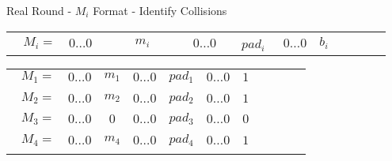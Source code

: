 \begin{frame}{Real Round - $M_i$ Format - Identify Collisions}

\begin{table}[]
\centering
\begin{tabular}{c|c|c|c|c|c|c|llll}
\cline{2-7}
$\, \ \ \ M_i = $ & $0 \dotsc 0$ & $\, \ \qquad m_i \, \ \qquad$ & $0 \dotsc 0$ & \ \ $pad_i \ \ $ & $0 \dotsc 0$ & $b_i$ &  &  &  &  \\ \cline{2-7}
\end{tabular}
\end{table}

\begin{table}[]
\centering
\begin{tabular}{ccccccrllll}
\cline{2-7}
\multicolumn{1}{c|}{$\ \ \ M_1 = $}      & \multicolumn{1}{c|}{$0 \dotsc 0$} & \multicolumn{1}{c|}{$m_1$}             & \multicolumn{1}{c|}{$0 \dotsc 0$} & \multicolumn{1}{c|}{$pad_1$}    & \multicolumn{1}{c|}{$0 \dotsc 0$} & \multicolumn{1}{r|}{$1$}  &  &  &  &  \\ \cline{2-7}
                                   &                                   &                                        &                                   &                                 &                                   &                           &  &  &  &  \\ \cline{2-7}
\multicolumn{1}{c|}{$\ \ \ M_2 = $}     & \multicolumn{1}{c|}{$0 \dotsc 0$} & \multicolumn{1}{c|}{$m_2$}             & \multicolumn{1}{c|}{$0 \dotsc 0$} & \multicolumn{1}{c|}{$pad_2$}    & \multicolumn{1}{c|}{$0 \dotsc 0$} & \multicolumn{1}{r|}{$1$}  &  &  &  &  \\ \cline{2-7}
                                   &                                   &                                        &                                   &                                 &                                   &                           &  &  &  &  \\ \cline{2-7}
\multicolumn{1}{c|}{$\ \ \ M_3 = $}      & \multicolumn{1}{c|}{$0 \dotsc 0$} & \multicolumn{1}{c|}{$0$}               & \multicolumn{1}{c|}{$0 \dotsc 0$} & \multicolumn{1}{c|}{$pad_3$}    & \multicolumn{1}{c|}{$0 \dotsc 0$} & \multicolumn{1}{r|}{$0$}  &  &  &  &  \\ \cline{2-7}
                                   &                                   &                                        &                                   &                                 &                                   &                           &  &  &  &  \\ \cline{2-7}
\multicolumn{1}{c|}{$\ \ \ M_4 = $}      & \multicolumn{1}{c|}{$0 \dotsc 0$} & \multicolumn{1}{c|}{$m_4$}             & \multicolumn{1}{c|}{$0 \dotsc 0$} & \multicolumn{1}{c|}{$pad_4$}    & \multicolumn{1}{c|}{$0 \dotsc 0$} & \multicolumn{1}{r|}{$1$}  &  &  &  &  \\ \cline{2-7}
\multicolumn{1}{l}{}               & \multicolumn{1}{l}{}              & \multicolumn{1}{l}{}                   & \multicolumn{1}{l}{}              & \multicolumn{1}{l}{}            & \multicolumn{1}{l}{}              &                           &  &  &  &  \\ \cline{2-7}


\end{tabular}
\end{table}
\end{frame}
